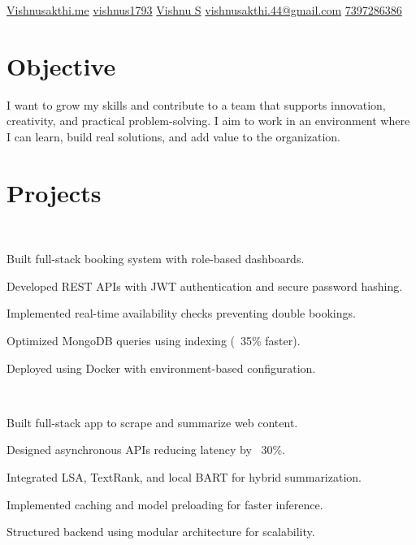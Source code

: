 \documentclass[]{plushcv}
\begin{document}
{\small\contactline
  {\href{https://www.vishnusakthi.me}{Vishnusakthi.me}}
  {\href{https://github.com/vishnus1793}{vishnus1793}}
  {\href{https://www.linkedin.com/in/vishnu-s-0477ba246}{Vishnu S}}
  {\href{mailto:vishnusakthi.44@gmail.com}{vishnusakthi.44@gmail.com}}
  {\href{tel:+917397286386}{7397286386}}
}


\begin{minipage}[t]{0.70\textwidth} 

\section{Objective}

I want to grow my skills and contribute to a team that supports innovation, creativity, and practical problem-solving. I aim to work in an environment where I can learn, build real solutions, and add value to the organization.


\section{Projects}

\\
\vspace{6pt}
\begin{tightemize}
\item Built full-stack booking system with role-based dashboards.
\item Developed REST APIs with JWT authentication and secure password hashing.
\item Implemented real-time availability checks preventing double bookings.
\item Optimized MongoDB queries using indexing (~35\% faster).
\item Deployed using Docker with environment-based configuration.
\end{tightemize}
\vspace{4pt}

\\
\begin{tightemize}
\item Built full-stack app to scrape and summarize web content.
\item Designed asynchronous APIs reducing latency by ~30\%.
\item Integrated LSA, TextRank, and local BART for hybrid summarization.
\item Implemented caching and model preloading for faster inference.
\item Structured backend using modular architecture for scalability.
\end{tightemize}
\vspace{4pt}


\end{minipage}
\end{document}
